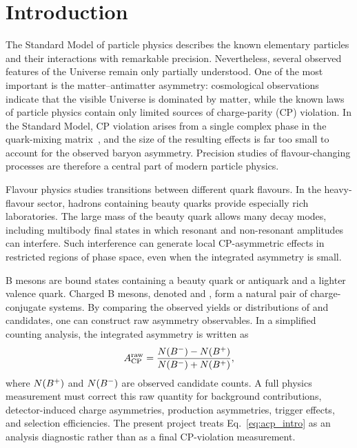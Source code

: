\section{Introduction}

The Standard Model of particle physics describes the known elementary particles and their interactions with remarkable precision. Nevertheless, several observed features of the Universe remain only partially understood. One of the most important is the matter--antimatter asymmetry: cosmological observations indicate that the visible Universe is dominated by matter, while the known laws of particle physics contain only limited sources of charge-parity (CP) violation. In the Standard Model, CP violation arises from a single complex phase in the quark-mixing matrix~\cite{ckm,km}, and the size of the resulting effects is far too small to account for the observed baryon asymmetry. Precision studies of flavour-changing processes are therefore a central part of modern particle physics.

Flavour physics studies transitions between different quark flavours. In the heavy-flavour sector, hadrons containing beauty quarks provide especially rich laboratories. The large mass of the beauty quark allows many decay modes, including multibody final states in which resonant and non-resonant amplitudes can interfere. Such interference can generate local CP-asymmetric effects in restricted regions of phase space, even when the integrated asymmetry is small.

B mesons are bound states containing a beauty quark or antiquark and a lighter valence quark. Charged B mesons, denoted \Bplus{} and \Bminus{}, form a natural pair of charge-conjugate systems. By comparing the observed yields or distributions of \Bplus{} and \Bminus{} candidates, one can construct raw asymmetry observables. In a simplified counting analysis, the integrated asymmetry is written as
\begin{equation}
  A_{\mathrm{CP}}^{\mathrm{raw}} =
  \frac{N(B^-) - N(B^+)}
       {N(B^-) + N(B^+)} ,
  \label{eq:acp_intro}
\end{equation}
where $N(B^+)$ and $N(B^-)$ are observed candidate counts. A full physics measurement must correct this raw quantity for background contributions, detector-induced charge asymmetries, production asymmetries, trigger effects, and selection efficiencies. The present project treats Eq.~\ref{eq:acp_intro} as an analysis diagnostic rather than as a final CP-violation measurement.

